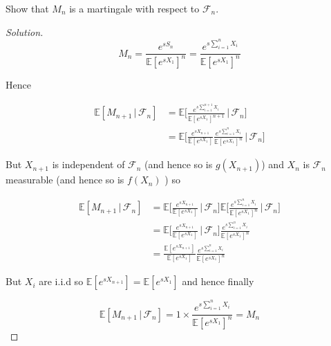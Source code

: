 \documentclass[12pt]{article}
\newenvironment{problem}[2][Problem]{\begin{trivlist}
\item[\hskip \labelsep {\bfseries #1}\hskip \labelsep {\bfseries #2.}]}{\end{trivlist}}
\newenvironment{solution}
  {\begin{proof}[Solution]\renewcommand{\qedsymbol}{}}
  {\end{proof}}
\begin{document}
\begin{problem}{3} 
Show that $M_n$ is a martingale with respect to $\mathcal{F}_n$.
\end{problem}
\begin{solution}\ \\
$$
M_n = \frac{e^{sS_n}}{\mathbb{E}[e^{sX_1}]^n} = \frac{e^{s\sum_{i=1}^n X_i}}{\mathbb{E}[e^{sX_1}]^n}
$$

Hence 

\begin{align*}
\mathbb{E}[M_{n+1} \, | \, \mathcal{F}_n] &= \mathbb{E}\bigg[\frac{e^{s\sum_{i=1}^{n+1} X_i}}{\mathbb{E}[e^{sX_1}]^{n+1}} \, \bigg| \, \mathcal{F}_n\bigg] \\
&= \mathbb{E}\bigg[\frac{e^{s X_{n+1}}}{\mathbb{E}[e^{sX_1}]} \frac{e^{s\sum_{i=1}^{n} X_i}}{\mathbb{E}[e^{sX_1}]^{n}} \, \bigg| \, \mathcal{F}_n\bigg] 
\end{align*}

But $X_{n+1}$ is independent of $\mathcal{F}_n$ (and hence so is $g(X_{n+1})$) and $X_n$ is $\mathcal{F}_n$ measurable (and hence so is $f(X_n)$ ) so 

\begin{align*}
\mathbb{E}[M_{n+1} \, | \, \mathcal{F}_n] &= \mathbb{E}\bigg[\frac{e^{s X_{n+1}}}{\mathbb{E}[e^{sX_1}]} \, \bigg| \, \mathcal{F}_n\bigg]\mathbb{E}\bigg[\frac{e^{s\sum_{i=1}^{n} X_i}}{\mathbb{E}[e^{sX_1}]^{n}} \, \bigg| \, \mathcal{F}_n\bigg] \\
&= \mathbb{E}\bigg[\frac{e^{s X_{n+1}}}{\mathbb{E}[e^{sX_1}]} \, \bigg| \, \mathcal{F}_n\bigg] \frac{e^{s\sum_{i=1}^{n} X_i}}{\mathbb{E}[e^{sX_1}]^{n}} \\
&= \frac{\mathbb{E}[e^{s X_{n+1}}]}{\mathbb{E}[e^{sX_1}]}  \frac{e^{s\sum_{i=1}^{n} X_i}}{\mathbb{E}[e^{sX_1}]^{n}}
\end{align*}

But $X_i$ are i.i.d so $\mathbb{E}[e^{s X_{n+1}}] = \mathbb{E}[e^{sX_1}]$ and hence finally

$$ \mathbb{E}[M_{n+1} \, | \, \mathcal{F}_n] = 1 \times  \frac{e^{s\sum_{i=1}^{n} X_i}}{\mathbb{E}[e^{sX_1}]^{n}} = M_n $$


\end{solution}
\end{document}
